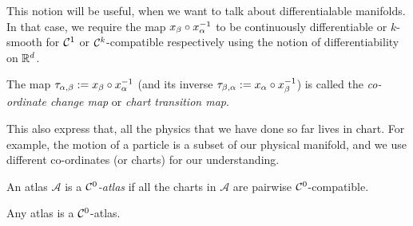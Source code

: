 This notion will be useful, when we want to talk about differentialable manifolds. In that case, we require the map \(x_{\beta} \circ x_{\alpha}^{-1}\) to be continuously differentiable or \(k\)-smooth for \(\mathcal C^1\) or \(\mathcal C^k\)-compatible respectively using the notion of differentiability on \(\mathbb R^d\).

\begin{remark}
	The map \(\tau_{\alpha, \beta} := x_{\beta} \circ x_{\alpha}^{-1}\) (and its inverse \(\tau_{\beta, \alpha} := x_{\alpha} \circ x_{\beta}^{-1}\)) is called the \emph{co-ordinate change map} or \emph{chart transition map}.
\end{remark}
This also express that, all the physics that we have done so far lives in chart. For example, the motion of a particle is a subset of our physical manifold, and we use different co-ordinates (or charts) for our understanding.

\begin{definition}[\(\SC^0\)-Atlas]
	An atlas \(\mathscr{A}\) is a \emph{\(\SC^0\)-atlas} if all the charts in \(\mathscr{A}\) are pairwise \(\SC^0\)-compatible.
\end{definition}

\noindent Any atlas is a \(\SC^0\)-atlas.
